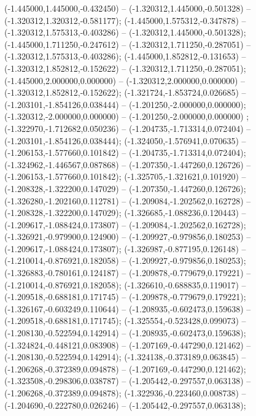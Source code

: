  (-1.445000,1.445000,-0.432450) -- (-1.320312,1.445000,-0.501328) -- (-1.320312,1.320312,-0.581177);
 (-1.445000,1.575312,-0.347878) -- (-1.320312,1.575313,-0.403286) -- (-1.320312,1.445000,-0.501328);
 (-1.445000,1.711250,-0.247612) -- (-1.320312,1.711250,-0.287051) -- (-1.320312,1.575313,-0.403286);
 (-1.445000,1.852812,-0.131653) -- (-1.320312,1.852812,-0.152622) -- (-1.320312,1.711250,-0.287051);
 (-1.445000,2.000000,0.000000) -- (-1.320312,2.000000,0.000000) -- (-1.320312,1.852812,-0.152622);
 (-1.321724,-1.853724,0.026685) -- (-1.203101,-1.854126,0.038444) -- (-1.201250,-2.000000,0.000000);
 (-1.320312,-2.000000,0.000000) -- (-1.201250,-2.000000,0.000000) ;
 (-1.322970,-1.712682,0.050236) -- (-1.204735,-1.713314,0.072404) -- (-1.203101,-1.854126,0.038444);
 (-1.324050,-1.576941,0.070635) -- (-1.206153,-1.577660,0.101842) -- (-1.204735,-1.713314,0.072404);
 (-1.324962,-1.446567,0.087868) -- (-1.207350,-1.447260,0.126726) -- (-1.206153,-1.577660,0.101842);
 (-1.325705,-1.321621,0.101920) -- (-1.208328,-1.322200,0.147029) -- (-1.207350,-1.447260,0.126726);
 (-1.326280,-1.202160,0.112781) -- (-1.209084,-1.202562,0.162728) -- (-1.208328,-1.322200,0.147029);
 (-1.326685,-1.088236,0.120443) -- (-1.209617,-1.088424,0.173807) -- (-1.209084,-1.202562,0.162728);
 (-1.326921,-0.979900,0.124900) -- (-1.209927,-0.979856,0.180253) -- (-1.209617,-1.088424,0.173807);
 (-1.326987,-0.877195,0.126148) -- (-1.210014,-0.876921,0.182058) -- (-1.209927,-0.979856,0.180253);
 (-1.326883,-0.780161,0.124187) -- (-1.209878,-0.779679,0.179221) -- (-1.210014,-0.876921,0.182058);
 (-1.326610,-0.688835,0.119017) -- (-1.209518,-0.688181,0.171745) -- (-1.209878,-0.779679,0.179221);
 (-1.326167,-0.603249,0.110644) -- (-1.208935,-0.602473,0.159638) -- (-1.209518,-0.688181,0.171745);
 (-1.325554,-0.523428,0.099073) -- (-1.208130,-0.522594,0.142914) -- (-1.208935,-0.602473,0.159638);
 (-1.324824,-0.448121,0.083908) -- (-1.207169,-0.447290,0.121462) -- (-1.208130,-0.522594,0.142914);
 (-1.324138,-0.373189,0.063845) -- (-1.206268,-0.372389,0.094878) -- (-1.207169,-0.447290,0.121462);
 (-1.323508,-0.298306,0.038787) -- (-1.205442,-0.297557,0.063138) -- (-1.206268,-0.372389,0.094878);
 (-1.322936,-0.223460,0.008738) -- (-1.204690,-0.222780,0.026246) -- (-1.205442,-0.297557,0.063138);

